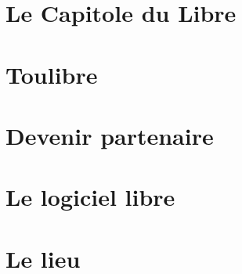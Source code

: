 \documentclass{cdl_sponsor}
\begin{document}

%
%
\section{Le Capitole du Libre}

	
	
\newpage

\section{Toulibre}

	

\newpage

\section{Devenir partenaire}

 

\newpage

\section{Le logiciel libre}

	

\section{Le lieu}
\end{document}
